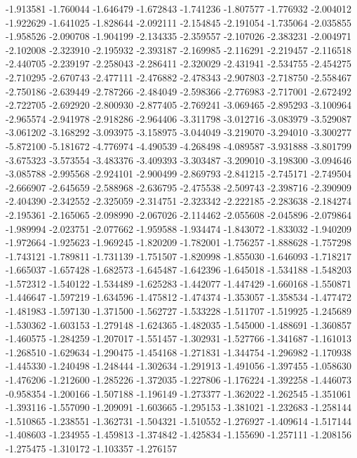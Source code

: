 -1.913581
-1.760044
-1.646479
-1.672843
-1.741236
-1.807577
-1.776932
-2.004012
-1.922629
-1.641025
-1.828644
-2.092111
-2.154845
-2.191054
-1.735064
-2.035855
-1.958526
-2.090708
-1.904199
-2.134335
-2.359557
-2.107026
-2.383231
-2.004971
-2.102008
-2.323910
-2.195932
-2.393187
-2.169985
-2.116291
-2.219457
-2.116518
-2.440705
-2.239197
-2.258043
-2.286411
-2.320029
-2.431941
-2.534755
-2.454275
-2.710295
-2.670743
-2.477111
-2.476882
-2.478343
-2.907803
-2.718750
-2.558467
-2.750186
-2.639449
-2.787266
-2.484049
-2.598366
-2.776983
-2.717001
-2.672492
-2.722705
-2.692920
-2.800930
-2.877405
-2.769241
-3.069465
-2.895293
-3.100964
-2.965574
-2.941978
-2.918286
-2.964406
-3.311798
-3.012716
-3.083979
-3.529087
-3.061202
-3.168292
-3.093975
-3.158975
-3.044049
-3.219070
-3.294010
-3.300277
-5.872100
-5.181672
-4.776974
-4.490539
-4.268498
-4.089587
-3.931888
-3.801799
-3.675323
-3.573554
-3.483376
-3.409393
-3.303487
-3.209010
-3.198300
-3.094646
-3.085788
-2.995568
-2.924101
-2.900499
-2.869793
-2.841215
-2.745171
-2.749504
-2.666907
-2.645659
-2.588968
-2.636795
-2.475538
-2.509743
-2.398716
-2.390909
-2.404390
-2.342552
-2.325059
-2.314751
-2.323342
-2.222185
-2.283638
-2.184274
-2.195361
-2.165065
-2.098990
-2.067026
-2.114462
-2.055608
-2.045896
-2.079864
-1.989994
-2.023751
-2.077662
-1.959588
-1.934474
-1.843072
-1.833032
-1.940209
-1.972664
-1.925623
-1.969245
-1.820209
-1.782001
-1.756257
-1.888628
-1.757298
-1.743121
-1.789811
-1.731139
-1.751507
-1.820998
-1.855030
-1.646093
-1.718217
-1.665037
-1.657428
-1.682573
-1.645487
-1.642396
-1.645018
-1.534188
-1.548203
-1.572312
-1.540122
-1.534489
-1.625283
-1.442077
-1.447429
-1.660168
-1.550871
-1.446647
-1.597219
-1.634596
-1.475812
-1.474374
-1.353057
-1.358534
-1.477472
-1.481983
-1.597130
-1.371500
-1.562727
-1.533228
-1.511707
-1.519925
-1.245689
-1.530362
-1.603153
-1.279148
-1.624365
-1.482035
-1.545000
-1.488691
-1.360857
-1.460575
-1.284259
-1.207017
-1.551457
-1.302931
-1.527766
-1.341687
-1.161013
-1.268510
-1.629634
-1.290475
-1.454168
-1.271831
-1.344754
-1.296982
-1.170938
-1.445330
-1.240498
-1.248444
-1.302634
-1.291913
-1.491056
-1.397455
-1.058630
-1.476206
-1.212600
-1.285226
-1.372035
-1.227806
-1.176224
-1.392258
-1.446073
-0.958354
-1.200166
-1.507188
-1.196149
-1.273377
-1.362022
-1.262545
-1.351061
-1.393116
-1.557090
-1.209091
-1.603665
-1.295153
-1.381021
-1.232683
-1.258144
-1.510865
-1.238551
-1.362731
-1.504321
-1.510552
-1.276927
-1.409614
-1.517144
-1.408603
-1.234955
-1.459813
-1.374842
-1.425834
-1.155690
-1.257111
-1.208156
-1.275475
-1.310172
-1.103357
-1.276157
